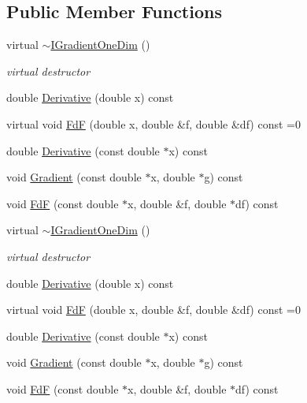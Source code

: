 \subsection*{Public Member Functions}
\begin{DoxyCompactItemize}
\item 
virtual \mbox{\hyperlink{classROOT_1_1Math_1_1IGradientOneDim_ab3a9fce54752c72f4ee4ed520f5cb80f}{$\sim$\+I\+Gradient\+One\+Dim}} ()
\begin{DoxyCompactList}\small\item\em virtual destructor \end{DoxyCompactList}\item 
double \mbox{\hyperlink{classROOT_1_1Math_1_1IGradientOneDim_a1fd109c1ddc7bae1c647f096e1fd527f}{Derivative}} (double x) const
\item 
virtual void \mbox{\hyperlink{classROOT_1_1Math_1_1IGradientOneDim_aef5560ea7d43e64d94bf875713e2a5fc}{FdF}} (double x, double \&f, double \&df) const =0
\item 
double \mbox{\hyperlink{classROOT_1_1Math_1_1IGradientOneDim_ab28c444cba126cc1b380d21120dd437f}{Derivative}} (const double $\ast$x) const
\item 
void \mbox{\hyperlink{classROOT_1_1Math_1_1IGradientOneDim_ac00c2cdc7a93ea4358f2f1df8e3499eb}{Gradient}} (const double $\ast$x, double $\ast$g) const
\item 
void \mbox{\hyperlink{classROOT_1_1Math_1_1IGradientOneDim_a4d51d8a5bfdb547348b6da33008f6a9e}{FdF}} (const double $\ast$x, double \&f, double $\ast$df) const
\item 
virtual \mbox{\hyperlink{classROOT_1_1Math_1_1IGradientOneDim_ab3a9fce54752c72f4ee4ed520f5cb80f}{$\sim$\+I\+Gradient\+One\+Dim}} ()
\begin{DoxyCompactList}\small\item\em virtual destructor \end{DoxyCompactList}\item 
double \mbox{\hyperlink{classROOT_1_1Math_1_1IGradientOneDim_a1fd109c1ddc7bae1c647f096e1fd527f}{Derivative}} (double x) const
\item 
virtual void \mbox{\hyperlink{classROOT_1_1Math_1_1IGradientOneDim_aef5560ea7d43e64d94bf875713e2a5fc}{FdF}} (double x, double \&f, double \&df) const =0
\item 
double \mbox{\hyperlink{classROOT_1_1Math_1_1IGradientOneDim_ab28c444cba126cc1b380d21120dd437f}{Derivative}} (const double $\ast$x) const
\item 
void \mbox{\hyperlink{classROOT_1_1Math_1_1IGradientOneDim_ac00c2cdc7a93ea4358f2f1df8e3499eb}{Gradient}} (const double $\ast$x, double $\ast$g) const
\item 
void \mbox{\hyperlink{classROOT_1_1Math_1_1IGradientOneDim_a4d51d8a5bfdb547348b6da33008f6a9e}{FdF}} (const double $\ast$x, double \&f, double $\ast$df) const
\end{DoxyCompactItemize}



